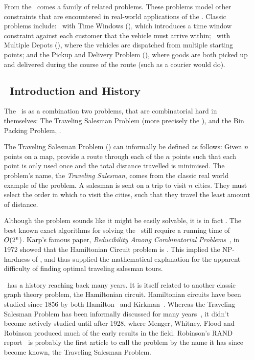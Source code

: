 From the \VRP\ comes a family of related problems. These problems model other constraints that are encountered in real-world applications of the \VRP. Classic problems include: \VRP\ with Time Windows (\VRPTW), which introduces a time window constraint against each customer that the vehicle must arrive within; \VRP\ with Multiple Depots (\MDVRP), where the vehicles are dispatched from multiple starting points; and the Pickup and Delivery Problem (\PDP), where goods are both picked up and delivered during the course of the route (such as a courier would do).

\subsection{\TSP\ Introduction and History}
\label{sec:tiah}

The \VRP\ is as a combination two problems, that are combinatorial hard in themselves: The Traveling Salesman Problem (more precisely the \MTSP), and the Bin Packing Problem, \BPP.

The Traveling Salesman Problem (\TSP) can informally be defined as follows: Given $n$ points on a map, provide a route through each of the $n$ points such that each point is only used once and the total distance travelled is minimised. The problem's name, the \emph{Traveling Salesman}, comes from the classic real world example of the problem. A salesman is sent on a trip to visit $n$ cities. They must select the order in which to visit the cities, such that they travel the least amount of distance.

Although the problem sounds like it might be easily solvable, it is in fact \nphard. The best known exact algorithms for solving the \TSP\ still require a running time of $\mbox{$O(2^n)$}$. Karp's famous paper, \emph{Reducibility Among Combinatorial Problems}~\cite{Kar72}, in 1972 showed that the Hamiltonian Circuit problem is \npcomplete. This implied the NP-hardness of \TSP, and thus supplied the mathematical explanation for the apparent difficulty of finding optimal traveling salesman tours. 


\TSP\ has a history reaching back many years. It is itself related to another classic graph theory problem, the Hamiltonian circuit. Hamiltonian circuits have been studied since 1856 by both Hamilton~\cite{Hamilton:1856} and Kirkman~\cite{Kirkman:1856}. Whereas the Traveling Salesman Problem has been informally discussed for many years~\cite{Schrijver}, it didn't become actively studied until after 1928, where Menger, Whitney, Flood and Robinson produced much of the early results in the field. Robinson's RAND report~\cite{Robinson:1949} is probably the first article to call the problem by the name it has since become known, the Traveling Salesman Problem. 

